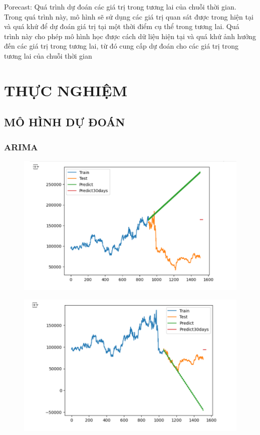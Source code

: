 \documentclass{article}
\begin{document}
\begin{multicols}{2}
            Porecast: Quá trình dự đoán các giá trị trong tương lai của chuỗi thời gian. Trong quá trình này, mô hình sẽ sử dụng các giá trị quan sát được trong hiện tại và quá khứ để dự đoán giá trị tại một thời điểm cụ thể trong tương lai. Quá trình này cho phép mô hình học được cách dữ liệu hiện tại và quá khứ ảnh hưởng đến các giá trị trong tương lai, từ đó cung cấp dự đoán cho các giá trị trong tương lai của chuỗi thời gian

\section{THỰC NGHIỆM}

\subsection{MÔ HÌNH DỰ ĐOÁN }
\subsubsection{ARIMA}
\begin{figure}[H]
    \centering
    \begin{minipage}{0.15\textwidth}
    \centering
    \includegraphics[width=1\textwidth]{Image/ARIMA/30_6_4_LG_Arima.png}
   
    \label{fig:1}
    \end{minipage}%
    \begin{minipage}{0.15\textwidth}
    \centering
    \includegraphics[width=1\textwidth]{Image/ARIMA/30_7_3_LG_Arima.png}
  

\end{minipage}
\end{figure}
\end{multicols}
\end{document}
